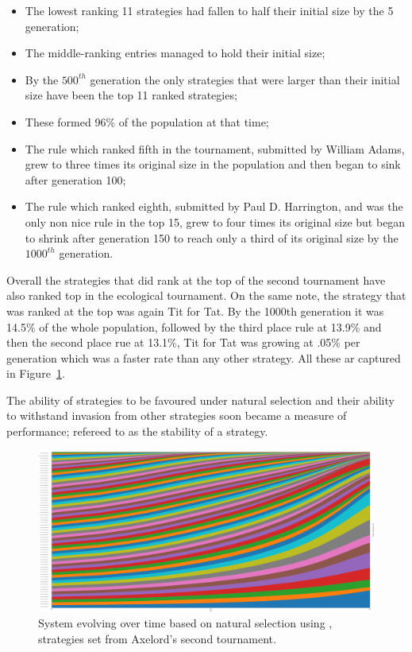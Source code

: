 \documentclass{article}
\theoremstyle{definition}
\begin{document}
\begin{itemize}
    \item The lowest ranking 11 strategies had fallen to half their initial size
    by the 5 generation;
    \item The middle-ranking entries managed to hold their initial size;
    \item By the \(500^{th}\) generation the only strategies that were larger than their
    initial size have been the top 11 ranked strategies;
    \item These formed 96\% of the population at that time;
    \item The rule which ranked fifth in the tournament, submitted by William Adams,
    grew to three times its original size in the population and then began to sink
    after generation 100;
    \item The rule which ranked eighth, submitted by Paul D. Harrington, and was
    the only non nice rule in the top 15, grew to four times its original size but
    began to shrink after generation 150 to reach only a third of its original
    size by the \(1000^{th}\) generation.
\end{itemize}

Overall the strategies that did rank at the top of the second tournament have
also ranked top in the ecological tournament. On the same note, the strategy that
was ranked at the top was again Tit for Tat. By the 1000th generation it was 14.5\%
of the whole population, followed by the third place rule at 13.9\% and then the
second place rue at 13.1\%, Tit for Tat was growing at .05\% per generation which
was a faster rate than any other strategy. All these ar captured in
Figure~\ref{fig:ecological.tournament}.

The ability of strategies to be favoured under natural selection and their
ability to withstand invasion from other strategies soon became a measure
of performance; refereed to as the stability of a strategy.

\begin{figure}[!hbtp]
    \centering
    \includegraphics[width=.6\textwidth]{./assets/images/ecological.pdf}
    \caption{System evolving over time based on natural selection using
    \cite{axelrodproject}, strategies set from Axelord's second tournament.}
    \label{fig:ecological.tournament}
\end{figure}
\end{document}
